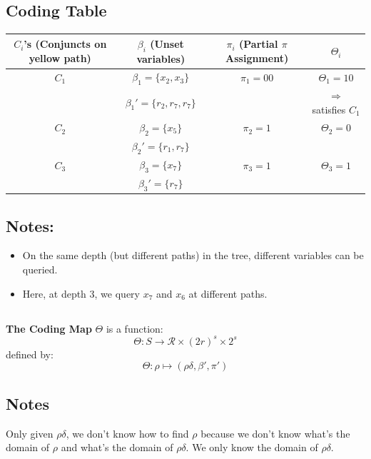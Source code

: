 \subsection*{Coding Table}
\begin{center}
\begin{tabular}{|c|c|c|c|}
\hline
\( C_i \)'s (Conjuncts on yellow path) & \( \beta_i \) (Unset variables) & \( \pi_i \) (Partial \( \pi \) Assignment) & \( \Theta_i \) \\ 
\hline
\( C_1 \) & \( \beta_1 = \{x_2, x_3\} \) & \( \pi_1 = 00 \) & \( \Theta_1 = 10 \) \\
         & \( \beta_1' = \{r_2, r_7, r_7\} \) & & \( \Rightarrow \) satisfies \( C_1 \) \\
\hline
\( C_2 \) & \( \beta_2 = \{x_5\} \) & \( \pi_2 = 1 \) & \( \Theta_2 = 0 \) \\
         & \( \beta_2' = \{r_1, r_7\} \) & & \\
\hline
\( C_3 \) & \( \beta_3 = \{x_7\} \) & \( \pi_3 = 1 \) & \( \Theta_3 = 1 \) \\
         & \( \beta_3' = \{r_7\} \) & & \\
\hline
\end{tabular}
\end{center}

\subsection*{Notes:}
\begin{itemize}
    \item On the same depth (but different paths) in the tree, different variables can be queried.
    \item Here, at depth 3, we query \( x_7 \) and \( x_6 \) at different paths.
\end{itemize}

\subsection*{ }

\noindent
\textbf{The Coding Map} \( \Theta \) is a function:
\[
\Theta: S \to \mathcal{R} \times (2r)^s \times 2^s
\]
defined by:
\[
\Theta: \rho \mapsto (\rho\delta, \beta', \pi')
\]

\subsection*{Notes}
\noindent
Only given \( \rho\delta \), we don't know how to find \( \rho \) because we don't know what's the domain of \( \rho \) and what's the domain of \( \rho\delta \). We only know the domain of \( \rho\delta \).

